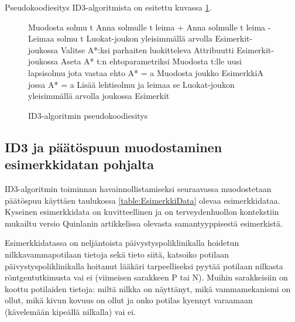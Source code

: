 \documentclass[12pt,finnish]{tktltiki2}
\theoremstyle{definition}
\theoremstyle{remark}
\begin{document}
Pseudokoodiesitys ID3-algoritmista on esitettu kuvassa \ref{fig:pseudokoodi}.


\begin{figure}
\begin{algorithmic}
\State Muodosta solmu t
    \State Anna solmulle t leima +
    \State{}
\EndIf
{}
    \State Anna solmulle t leima -
    \State{}
\EndIf
\State Leimaa solmu t Luokat-joukon yleisimmällä arvolla Esimerkit-joukossa  
    \State{}
\EndIf    
\State Valitse {A*}:ksi {parhaiten luokitteleva Attribuutti Esimerkit-joukossa}
\State Aseta A* t:n ehtoparametriksi
    \State Muodosta t:lle uusi lapsisolmu jota vastaa ehto A* = a
    \State Muodosta joukko EsimerkkiA jossa A* = a
        \State Lisää lehtisolmu ja leimaa se Luokat-joukon yleisimmällä arvolla joukossa Esimerkit
    \Else
    \EndIf
\EndFor
\State{}
\EndFunction
\end{algorithmic}
\caption{ID3-algoritmin pseudokoodiesitys}
\label{fig:pseudokoodi}
\end{figure}


\subsection{ID3 ja päätöspuun muodostaminen esimerkkidatan pohjalta}

ID3-algoritmin toiminnan havainnollistamiseksi seuraavassa muodostetaan päätöspuu käyttäen taulukossa \ref{table:EsimerkkiData} olevaa esimerkkidataa.
Kyseinen esimerkkidata on kuvitteellinen ja on terveydenhuollon kontekstiin mukailtu versio Quinlanin artikkelissa
\cite{quinlan} olevasta samantyyppisestä esimerkistä. 

Esimerkkidatassa on neljäntoista päivystyspoliklinikalla hoidetun nilkkavammapotilaan tietoja sekä tieto siitä, katsoiko potilaan
päivystyspoliklinikalla hoitanut lääkäri tarpeelliseksi pyytää potilaan nilkasta röntgentutkimusta vai ei (viimeisen
sarakkeen P tai N). Muihin sarakkeisiin on koottu potilaiden tietoja: miltä nilkka on näyttänyt, mikä vammamekanismi on ollut, mikä kivun kovuus
on ollut ja onko potilas kyennyt varaamaan (kävelemään kipeällä nilkalla) vai ei.
\end{document}
